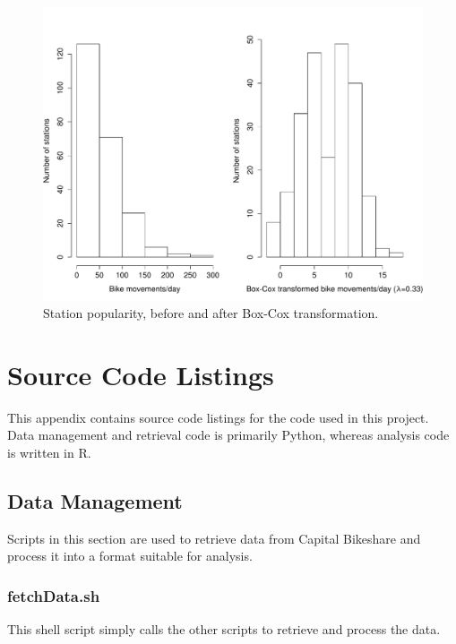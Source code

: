 \documentclass[letterpaper,11pt]{article}
\begin{document}
\begin{figure}[t]
  \label{boxcox}
  \includegraphics[width=\textwidth]{boxcox.pdf}
  \caption{Station popularity, before and after Box-Cox transformation.}
\end{figure}

\clearpage\newpage
\printbibliography

\newpage
{}
\fancyhfoffset[E,O]{0pt}
\appendix
\section{Source Code Listings}

This appendix contains source code listings for the code used in this
project. Data management and retrieval code is primarily Python,
whereas analysis code is written in R.

\subsection{Data Management}

Scripts in this section are used to retrieve data from Capital
Bikeshare and process it into a format suitable for analysis.

\subsubsection{fetchData.sh}
\label{fetchData.sh}

This shell script simply calls the other scripts to retrieve and
process the data.
\end{document}
